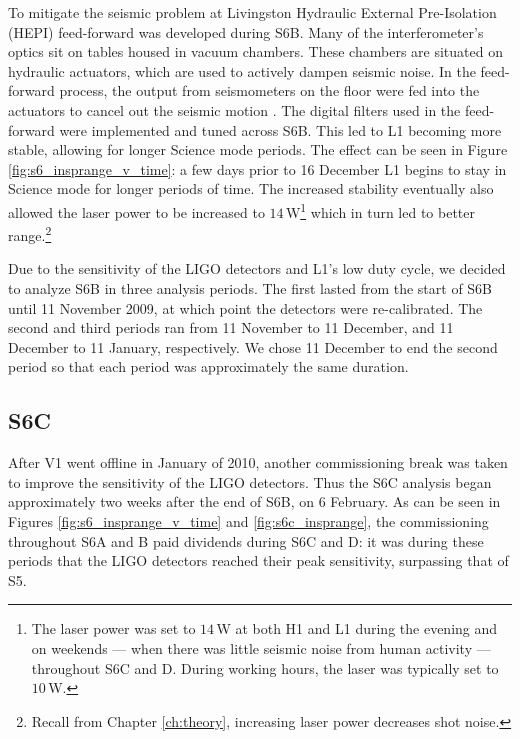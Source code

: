 To mitigate the seismic problem at Livingston Hydraulic External Pre-Isolation
(HEPI) feed-forward was developed during S6B. Many of the interferometer's
optics sit on tables housed in vacuum chambers. These chambers are situated on
hydraulic actuators, which are used to actively dampen seismic noise. In the
feed-forward process, the output from seismometers on the floor were fed into
the actuators to cancel out the seismic motion \cite{Lundgren:personal-comm}.
The digital filters used in the feed-forward were implemented and tuned across
S6B. This led to L1 becoming more stable, allowing for longer Science mode
periods. The effect can be seen in Figure \ref{fig:s6_insprange_v_time}: a few
days prior to 16 December L1 begins to stay in Science mode for longer periods
of time. The increased stability eventually also allowed the laser power to be
increased to $14\,$W\footnote{The laser power was set to $14\,$W at both H1 and
L1 during the evening and on weekends --- when there was little seismic noise
from human activity --- throughout S6C and D. During working hours, the laser
was typically set to $10\,$W.} which in turn led to better
range.\footnote{Recall from Chapter \ref{ch:theory}, increasing laser power
decreases shot noise.}

Due to the sensitivity of the \ac{LIGO} detectors and L1's low duty cycle, we
decided to analyze S6B in three analysis periods. The first lasted from the
start of S6B until 11 November 2009, at which point the detectors were
re-calibrated. The second and third periods ran from 11 November to 11
December, and 11 December to 11 January, respectively. We chose 11 December to
end the second period so that each period was approximately the same duration.

\subsection{S6C}
\label{sec:s6c}

After V1 went offline in January of 2010, another commissioning break was taken
to improve the sensitivity of the \ac{LIGO} detectors. Thus the S6C analysis
began approximately two weeks after the end of S6B, on 6 February. As can be
seen in Figures \ref{fig:s6_insprange_v_time} and \ref{fig:s6c_insprange}, the
commissioning throughout S6A and B paid dividends during S6C and D: it was
during these periods that the \ac{LIGO} detectors reached their peak
sensitivity, surpassing that of \ac{S5}.

